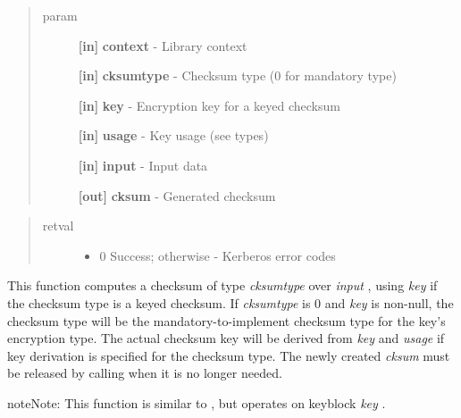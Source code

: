 \documentclass[letterpaper,10pt,english]{sphinxmanual}
\begin{document}
\begin{quote}\begin{description}
\item[{param}] \leavevmode
\textbf{{[}in{]}} \textbf{context} - Library context

\textbf{{[}in{]}} \textbf{cksumtype} - Checksum type (0 for mandatory type)

\textbf{{[}in{]}} \textbf{key} - Encryption key for a keyed checksum

\textbf{{[}in{]}} \textbf{usage} - Key usage (see  types)

\textbf{{[}in{]}} \textbf{input} - Input data

\textbf{{[}out{]}} \textbf{cksum} - Generated checksum

\end{description}\end{quote}
\begin{quote}\begin{description}
\item[{retval}] \leavevmode\begin{itemize}
\item {} 
0   Success; otherwise - Kerberos error codes

\end{itemize}

\end{description}\end{quote}

This function computes a checksum of type \emph{cksumtype} over \emph{input} , using \emph{key} if the checksum type is a keyed checksum. If \emph{cksumtype} is 0 and \emph{key} is non-null, the checksum type will be the mandatory-to-implement checksum type for the key's encryption type. The actual checksum key will be derived from \emph{key} and \emph{usage} if key derivation is specified for the checksum type. The newly created \emph{cksum} must be released by calling {\hyperref[appdev/refs/api/krb5_free_checksum_contents:krb5_free_checksum_contents]{}} when it is no longer needed.




{\hyperref[appdev/refs/api/krb5_c_verify_checksum:krb5_c_verify_checksum]{}}



\begin{notice}{note}{Note:}
This function is similar to {\hyperref[appdev/refs/api/krb5_k_make_checksum:krb5_k_make_checksum]{}} , but operates on keyblock \emph{key} .
\end{notice}
\end{document}
